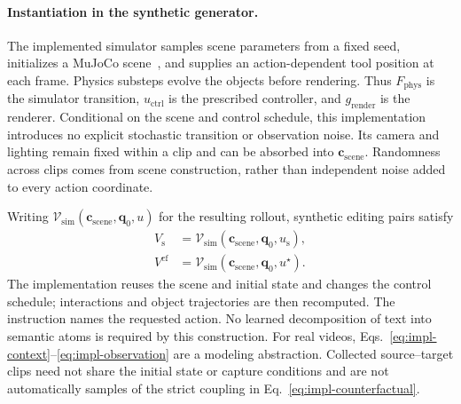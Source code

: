 \paragraph{Instantiation in the synthetic generator.}
The implemented simulator samples scene parameters from a fixed seed,
initializes a MuJoCo scene~\citep{todorov2012mujoco}, and supplies an action-dependent tool position
at each frame. Physics substeps evolve the objects before rendering.
Thus $F_{\mathrm{phys}}$ is the simulator transition, $u_{\mathrm{ctrl}}$
is the prescribed controller, and $g_{\mathrm{render}}$ is the renderer.
Conditional on the scene and control schedule, this implementation introduces
no explicit stochastic transition or observation noise.
Its camera and lighting remain fixed within a clip and can be absorbed into
$\mathbf c_{\mathrm{scene}}$. Randomness across clips comes from scene construction,
rather than independent noise added to every action coordinate.

Writing $\mathcal V_{\mathrm{sim}}(\mathbf c_{\mathrm{scene}},\mathbf q_0,u)$ for the resulting
rollout, synthetic editing pairs satisfy
\begin{equation}
 \begin{aligned}
  V_{\mathrm s}&=\mathcal V_{\mathrm{sim}}(\mathbf c_{\mathrm{scene}},\mathbf q_0,u_{\mathrm s}),\\
  V^{\mathrm{cf}}&=\mathcal V_{\mathrm{sim}}(\mathbf c_{\mathrm{scene}},\mathbf q_0,u^\star).
 \end{aligned}
 \label{eq:impl-counterfactual}
\end{equation}
The implementation reuses the scene and initial state and changes the
control schedule; interactions and object trajectories are then recomputed.
The instruction names the requested action. No learned decomposition of
text into semantic atoms is required by this construction.
For real videos, Eqs.~\ref{eq:impl-context}--\ref{eq:impl-observation} are a
modeling abstraction. Collected source--target clips need not share the
initial state or capture conditions and are not automatically samples of
the strict coupling in Eq.~\ref{eq:impl-counterfactual}.

